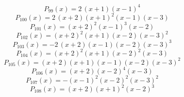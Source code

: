 \subitem \begin{dmath*}P_{99}(x) = 2 \, {\left(x + 1\right)} {\left(x - 1\right)}^{4} \end{dmath*}\vspace{-1.2cm}
\subitem \begin{dmath*}P_{100}(x) = 2 \, {\left(x + 2\right)} {\left(x + 1\right)}^{2} {\left(x - 1\right)} {\left(x - 3\right)} \end{dmath*}\vspace{-1.2cm}
\subitem \begin{dmath*}P_{101}(x) = {\left(x + 2\right)}^{2} {\left(x - 1\right)}^{3} {\left(x - 2\right)} \end{dmath*}\vspace{-1.2cm}
\subitem \begin{dmath*}P_{102}(x) = {\left(x + 2\right)}^{2} {\left(x + 1\right)} {\left(x - 2\right)} {\left(x - 3\right)}^{2} \end{dmath*}\vspace{-1.2cm}
\subitem \begin{dmath*}P_{103}(x) = -2 \, {\left(x + 2\right)} {\left(x - 1\right)} {\left(x - 2\right)} {\left(x - 3\right)}^{3} \end{dmath*}\vspace{-1.2cm}
\subitem \begin{dmath*}P_{104}(x) = {\left(x + 2\right)}^{2} {\left(x + 1\right)} {\left(x - 2\right)}^{2} {\left(x - 3\right)} \end{dmath*}\vspace{-1.2cm}
\subitem \begin{dmath*}P_{105}(x) = {\left(x + 2\right)} {\left(x + 1\right)} {\left(x - 1\right)} {\left(x - 2\right)} {\left(x - 3\right)}^{2} \end{dmath*}\vspace{-1.2cm}
\subitem \begin{dmath*}P_{106}(x) = {\left(x + 2\right)} {\left(x - 2\right)}^{4} {\left(x - 3\right)} \end{dmath*}\vspace{-1.2cm}
\subitem \begin{dmath*}P_{107}(x) = -{\left(x - 1\right)}^{2} {\left(x - 2\right)}^{2} {\left(x - 3\right)}^{2} \end{dmath*}\vspace{-1.2cm}
\subitem \begin{dmath*}P_{108}(x) = {\left(x + 2\right)} {\left(x + 1\right)}^{2} {\left(x - 2\right)}^{3} \end{dmath*}\vspace{-1.2cm}
